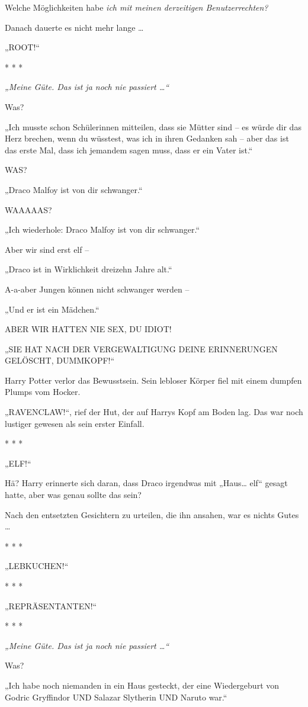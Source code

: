 {Welche Möglichkeiten habe \emph{ich mit meinen derzeitigen Benutzerrechten?}

Danach dauerte es nicht mehr lange …

„ROOT!“

* * *

\emph{„Meine Güte. Das ist ja noch nie passiert …“}

Was?

„Ich musste schon Schülerinnen mitteilen, dass sie Mütter sind -- es würde dir das Herz brechen, wenn du wüsstest, was ich in ihren Gedanken sah -- aber das ist das erste Mal, dass ich jemandem sagen muss, dass er ein Vater ist.“

WAS?

„Draco Malfoy ist von dir schwanger.“

WAAAAAS?

„Ich wiederhole: Draco Malfoy ist von dir schwanger.“

Aber wir sind erst elf --

„Draco ist in Wirklichkeit dreizehn Jahre alt.“

A-a-aber Jungen können nicht schwanger werden --

„Und er ist ein Mädchen.“

ABER WIR HATTEN NIE SEX, DU IDIOT!

„SIE HAT NACH DER VERGEWALTIGUNG DEINE ERINNERUNGEN GELÖSCHT, DUMMKOPF!“

Harry Potter verlor das Bewusstsein. Sein lebloser Körper fiel mit einem dumpfen Plumps vom Hocker.

„RAVENCLAW!“, rief der Hut, der auf Harrys Kopf am Boden lag. Das war noch lustiger gewesen als sein erster Einfall.

* * *

„ELF!“

Hä? Harry erinnerte sich daran, dass Draco irgendwas mit „Haus… elf“ gesagt hatte, aber was genau sollte das sein?

Nach den entsetzten Gesichtern zu urteilen, die ihn ansahen, war es nichts Gutes …

* * *

„LEBKUCHEN!“

* * *

„REPRÄSENTANTEN!“

* * *

\emph{„Meine Güte. Das ist ja noch nie passiert …“}

Was?

„Ich habe noch niemanden in ein Haus gesteckt, der eine Wiedergeburt von Godric Gryffindor UND Salazar Slytherin UND Naruto war.“

}
